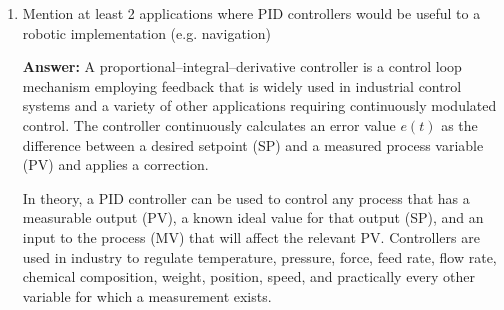 \documentclass[12pt]{article}
\begin{document}
\begin{enumerate}
\begin{itemize}
    \end{itemize}
    
    \item Mention at least 2 applications where PID controllers would be useful to a robotic implementation (e.g. navigation)
    
    \textbf{Answer: }A proportional–integral–derivative controller is a control loop mechanism employing feedback that is widely used in industrial control systems and a variety of other applications requiring continuously modulated control. The controller continuously calculates an error value $e(t)$ as the difference between a desired setpoint (SP) and a measured process variable (PV) and applies a correction.

    In theory, a PID controller can be used to control any process that has a measurable output (PV), a known ideal value for that output (SP), and an input to the process (MV) that will affect the relevant PV. Controllers are used in industry to regulate temperature, pressure, force, feed rate, flow rate, chemical composition, weight, position, speed, and practically every other variable for which a measurement exists.
    
\end{enumerate}
\end{document}
